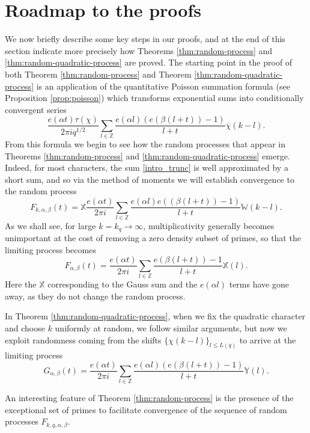\documentclass[12pt, a4paper]{amsart}
\theoremstyle{remark}
\newcommand{\Z}{\ensuremath{\mathbb{Z}}}
\newcommand{\chibar}{\overline \chi}
\newcommand{\bW}{\mathbb{W}}
\newcommand{\bX}{\mathbb{X}}
\newcommand{\bY}{\mathbb{Y}}
\begin{document}
\section{Roadmap to the proofs}\label{roadmap}
We now briefly describe some key steps in our proofs,
and at the end of this section indicate more precisely how Theorems \ref{thm:random-process} and \ref{thm:random-quadratic-process}
are proved.
The starting point in the proof of both Theorem \ref{thm:random-process} and
Theorem \ref{thm:random-quadratic-process} is an application of the quantitative  Poisson
summation formula (see Proposition \ref{prop:poisson}) which transforms
exponential sums into conditionally convergent series
\begin{equation}\label{intro_trunc}
   \frac{e(\alpha t)\tau(\chi)}{2\pi i q^{1/2}} \sum_{l \in \Z}
    \frac{e(\alpha l) (e(\beta(l + t)) - 1)}
    {l + t }
    \chibar(k-l).
\end{equation}
From this formula we begin to see how the random processes that appear in
Theorems \ref{thm:random-process} and \ref{thm:random-quadratic-process}
emerge. Indeed, for most characters, the sum \eqref{intro_trunc} is well
approximated by a short sum, and so via the method of moments we will establish convergence to the random process
\[
    F_{k, \alpha,\beta}(t) = \bX \frac{e(\alpha t)}{2\pi i}
    \sum_{l \in \Z}
    \frac{e(\alpha l) e((\beta(l + t)) - 1)}
    {l + t}
    \bW(k-l).
\]
As we shall see, for large $k=k_q\to\infty$, multiplicativity generally becomes unimportant at the cost of removing a
zero density subset of primes, so that the limiting process becomes
\[
    F_{\alpha,\beta}(t) = \frac{e(\alpha t)}{2\pi i}
    \sum_{l \in \Z}
    \frac{e(\beta(l + t)) - 1}
    {l + t}
    \bX(l).
\]
Here the $\bX$ corresponding to the Gauss sum and the $e(\alpha l)$
terms have gone away, as they do not change the random process.

In Theorem \ref{thm:random-quadratic-process}, when we fix the quadratic
character and choose $k$ uniformly at random, we follow similar arguments, but
now we exploit randomness coming from the shifts $\{\chi(k-l)\}_{l\le L(q)}$ to arrive at the limiting process 
\[
    G_{\alpha,\beta}(t) = \frac{e(\alpha t)}{2 \pi i}
    \sum_{l \in \Z}
    \frac{e(\alpha l) (e(\beta(l + t)) - 1)}
    {l + t}
    \bY(l).
\]

An interesting feature of Theorem \ref{thm:random-process} is the presence of the exceptional  set of primes to facilitate convergence of the sequence of random processes $F_{k, q,\alpha,\beta}.$ 
\end{document}
